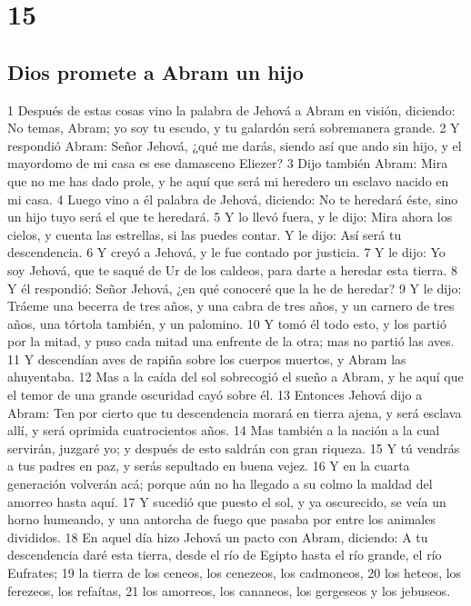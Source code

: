 \chapter{15}

\section*{Dios promete a Abram un hijo}

1 Después de estas cosas vino la palabra de Jehová a Abram en visión, diciendo: No temas, Abram; yo soy tu escudo, y tu galardón será sobremanera grande.
2 Y respondió Abram: Señor Jehová, ¿qué me darás, siendo así que ando sin hijo, y el mayordomo de mi casa es ese damasceno Eliezer?
3 Dijo también Abram: Mira que no me has dado prole, y he aquí que será mi heredero un esclavo nacido en mi casa.
4 Luego vino a él palabra de Jehová, diciendo: No te heredará éste, sino un hijo tuyo será el que te heredará.
5 Y lo llevó fuera, y le dijo: Mira ahora los cielos, y cuenta las estrellas, si las puedes contar. Y le dijo: Así será tu descendencia.
6 Y creyó a Jehová, y le fue contado por justicia.
7 Y le dijo: Yo soy Jehová, que te saqué de Ur de los caldeos, para darte a heredar esta tierra.
8 Y él respondió: Señor Jehová, ¿en qué conoceré que la he de heredar?
9 Y le dijo: Tráeme una becerra de tres años, y una cabra de tres años, y un carnero de tres años, una tórtola también, y un palomino.
10 Y tomó él todo esto, y los partió por la mitad, y puso cada mitad una enfrente de la otra; mas no partió las aves.
11 Y descendían aves de rapiña sobre los cuerpos muertos, y Abram las ahuyentaba.
12 Mas a la caída del sol sobrecogió el sueño a Abram, y he aquí que el temor de una grande oscuridad cayó sobre él.
13 Entonces Jehová dijo a Abram: Ten por cierto que tu descendencia morará en tierra ajena, y será esclava allí, y será oprimida cuatrocientos años.
14 Mas también a la nación a la cual servirán, juzgaré yo; y después de esto saldrán con gran riqueza.
15 Y tú vendrás a tus padres en paz, y serás sepultado en buena vejez.
16 Y en la cuarta generación volverán acá; porque aún no ha llegado a su colmo la maldad del amorreo hasta aquí.
17 Y sucedió que puesto el sol, y ya oscurecido, se veía un horno humeando, y una antorcha de fuego que pasaba por entre los animales divididos.
18 En aquel día hizo Jehová un pacto con Abram, diciendo: A tu descendencia daré esta tierra, desde el río de Egipto hasta el río grande, el río Eufrates;
19 la tierra de los ceneos, los cenezeos, los cadmoneos,
20 los heteos, los ferezeos, los refaítas,
21 los amorreos, los cananeos, los gergeseos y los jebuseos.

